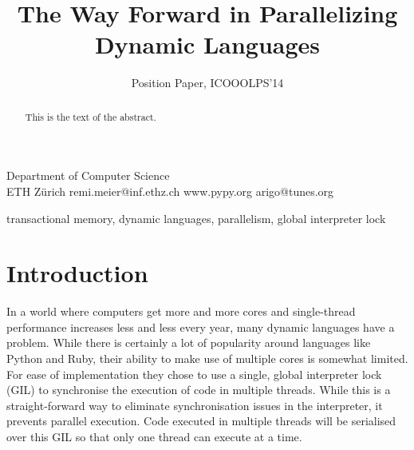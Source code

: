 \documentclass{sigplanconf}
\begin{document}
\setlength{\pdfpageheight}{\paperheight}
\setlength{\pdfpagewidth}{\paperwidth}






\title{The Way Forward in Parallelizing Dynamic Languages}
\subtitle{Position Paper, ICOOOLPS'14}

           {Department of Computer Science\\ ETH Zürich}
           {remi.meier@inf.ethz.ch}
           {www.pypy.org}
           {arigo@tunes.org}

\maketitle

\begin{abstract}
This is the text of the abstract.
\end{abstract}



\keywords
transactional memory, dynamic languages, parallelism, global interpreter lock

\section{Introduction}
In a world where computers get more and more cores and single-thread
performance increases less and less every year, many dynamic languages
have a problem. While there is certainly a lot of popularity around
languages like Python and Ruby, their ability to make use of multiple
cores is somewhat limited. For ease of implementation they chose to
use a single, global interpreter lock (GIL) to synchronise the
execution of code in multiple threads. While this is a
straight-forward way to eliminate synchronisation issues in the
interpreter, it prevents parallel execution. Code executed in multiple
threads will be serialised over this GIL so that only one thread can
execute at a time.
\end{document}
